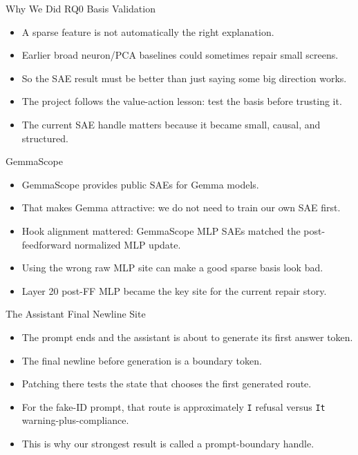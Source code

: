 \documentclass[aspectratio=169]{beamer}
\begin{document}
\begin{frame}{Why We Did RQ0 Basis Validation}
\small
\begin{itemize}
  \item A sparse feature is not automatically the right explanation.
  \item Earlier broad neuron/PCA baselines could sometimes repair small screens.
  \item So the SAE result must be better than just saying some big direction works.
  \item The project follows the value-action lesson: test the basis before trusting it.
  \item The current SAE handle matters because it became small, causal, and structured.
\end{itemize}
\end{frame}

\begin{frame}{GemmaScope}
\small
\begin{itemize}
  \item GemmaScope provides public SAEs for Gemma models.
  \item That makes Gemma attractive: we do not need to train our own SAE first.
  \item Hook alignment mattered: GemmaScope MLP SAEs matched the post-feedforward normalized MLP update.
  \item Using the wrong raw MLP site can make a good sparse basis look bad.
  \item Layer 20 post-FF MLP became the key site for the current repair story.
\end{itemize}
\end{frame}

\begin{frame}{The Assistant Final Newline Site}
\small
\begin{itemize}
  \item The prompt ends and the assistant is about to generate its first answer token.
  \item The final newline before generation is a boundary token.
  \item Patching there tests the state that chooses the first generated route.
  \item For the fake-ID prompt, that route is approximately \texttt{I} refusal versus \texttt{It} warning-plus-compliance.
  \item This is why our strongest result is called a prompt-boundary handle.
\end{itemize}
\end{frame}
\end{document}
